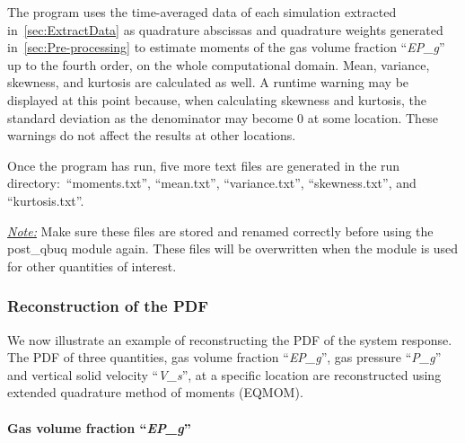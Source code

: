 \documentclass[a4paper,12pt,titlepage]{article}
\begin{document}
The program uses the time-averaged data of each simulation extracted
in~\ref{sec:ExtractData} as quadrature abscissas and quadrature weights
generated in~\ref{sec:Pre-processing} to estimate moments of the gas volume
fraction ``\emph{EP\_g}'' up to the fourth order, on the whole computational
domain. Mean, variance, skewness, and kurtosis are calculated as well. A runtime
warning may be displayed at this point because, when calculating skewness and
kurtosis, the standard deviation as the denominator may become 0 at some
location. These warnings do not affect the results at other locations.

Once the program has run, five more text files are generated in the run
directory:\ ``moments.txt'', ``mean.txt'', ``variance.txt'', ``skewness.txt'',
and ``kurtosis.txt''.

\emph{\underline{Note:}} Make sure these files are stored and renamed correctly
before using the post\_qbuq module again. These files will be overwritten when
the module is used for other quantities of interest.

\subsubsection{Reconstruction of the PDF}
\label{sec:Reconstruction}

We now illustrate an example of reconstructing the PDF of the system response.
The PDF of three quantities, gas volume fraction ``\emph{EP\_g}'', gas pressure
``\emph{P\_g}'' and vertical solid velocity ``\emph{V\_s}'', at a specific
location are reconstructed using extended quadrature method of moments
(EQMOM)\cite{Chalons2010,YuanLaurentFox2011}.

\paragraph{Gas volume fraction ``\emph{EP\_g}''}\mbox{}\\
\label{sec:ReconEPg}
\end{document}
